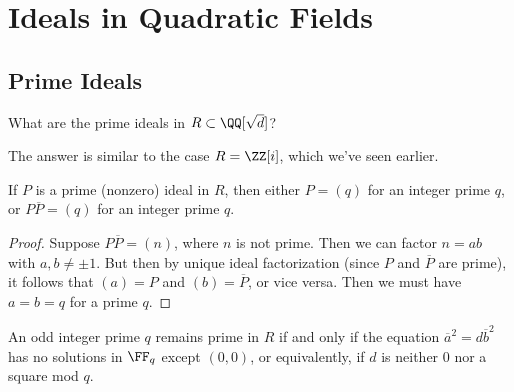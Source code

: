 

\section{Ideals in Quadratic Fields}

\subsection{Prime Ideals}

\vspace{0.75em}

\begin{qq}
What are the prime ideals in $R \subset \QQ[\sqrt{d}]$?
\end{qq}


The answer is similar to the case $R = \ZZ[i]$, which we've seen earlier.

\begin{lemma}
If $P$ is a prime (nonzero) ideal in $R$, then either $P = (q)$ for an integer prime $q$, or $P\overline{P} = (q)$ for an integer prime $q$. 
\end{lemma}

\begin{proof}
Suppose $P\overline{P} = (n)$, where $n$ is not prime. Then we can factor $n = ab$ with $a, b \neq \pm 1$. But then by unique ideal factorization (since $P$ and $\overline{P}$ are prime), it follows that $(a) = P$ and $(b) = \overline{P}$, or vice versa. Then we must have $a = b = q$ for a prime $q$. 
\end{proof}

\begin{lemma}
An odd integer prime $q$ remains prime in $R$ if and only if the equation $\overline{a}^2 = d\overline{b}^2$ has no solutions in $\FF_q$ except $(0, 0)$, or equivalently, if $d$ is neither $0$ nor a square mod $q$. 
\end{lemma}

